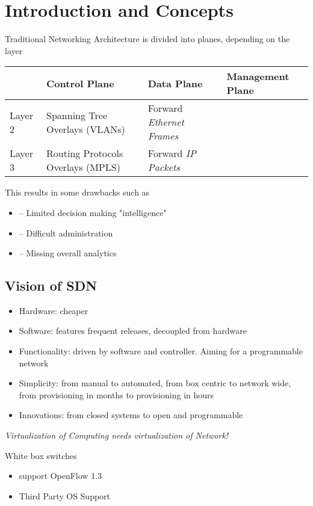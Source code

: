 \section{Introduction and Concepts}
Traditional Networking Architecture is divided into planes, depending on the layer
\begin{table}[h]
	\begin{tabular}{p{}|p{}|p{}|p{}}
		& Control Plane & Data Plane & Management Plane \\
		\hline
		Layer 2 & Spanning Tree Overlays (VLANs) & Forward \emph{Ethernet Frames} & \\
		\hline
		Layer 3 & Routing Protocols Overlays (MPLS) & Forward \emph{IP Packets} &
	\end{tabular}
\end{table}

\noindent
This results in some drawbacks such as
\begin{itemize}
	\item -- Limited decision making "intelligence"
	\item -- Difficult administration
	\item -- Missing overall analytics
\end{itemize}

\subsection{Vision of SDN}
\begin{itemize}
	\item Hardware: cheaper
	\item Software: features frequent releases, decoupled from hardware
	\item Functionality: driven by software and controller. Aiming for a programmable network
	\item Simplicity: from manual to automated, from box centric to network wide, from provisioning in months to provisioning in hours
	\item Innovations: from closed systems to open and programmable
\end{itemize}

\noindent
\emph{Virtualization of Computing needs virtualization of Network!}

\noindent
White box switches 
\begin{itemize}
	\item support OpenFlow 1.3
	\item Third Party OS Support
\end{itemize}

